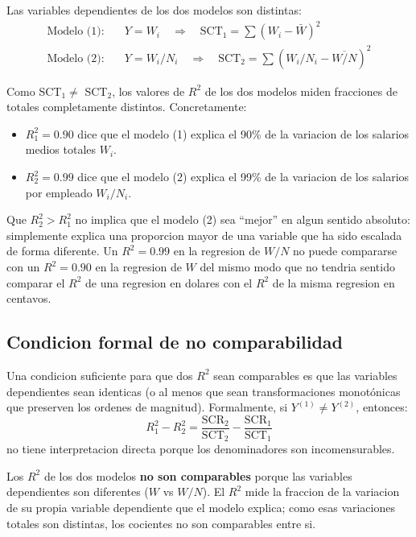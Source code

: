\documentclass[12pt, letterpaper]{article}
\theoremstyle{remark}
\begin{document}
Las variables dependientes de los dos modelos son distintas:
\begin{align}
  \text{Modelo (1):} \quad &Y = W_i \quad \Rightarrow \quad \text{SCT}_1 = \sum(W_i - \bar W)^2\\
  \text{Modelo (2):} \quad &Y = W_i/N_i \quad \Rightarrow \quad \text{SCT}_2 = \sum(W_i/N_i - \overline{W/N})^2
\end{align}

Como SCT$_1 \neq$ SCT$_2$, los valores de $R^2$ de los dos modelos miden
fracciones de totales completamente distintos. Concretamente:

\begin{itemize}[leftmargin=1.6em, itemsep=4pt]
  \item $R^2_1 = 0.90$ dice que el modelo (1) explica el 90\% de la variacion de
    los salarios medios totales $W_i$.
  \item $R^2_2 = 0.99$ dice que el modelo (2) explica el 99\% de la variacion de
    los salarios por empleado $W_i/N_i$.
\end{itemize}

Que $R^2_2 > R^2_1$ no implica que el modelo (2) sea ``mejor'' en algun sentido
absoluto: simplemente explica una proporcion mayor de una variable que ha sido
escalada de forma diferente. Un $R^2 = 0.99$ en la regresion de $W/N$ no puede
compararse con un $R^2 = 0.90$ en la regresion de $W$ del mismo modo que no
tendria sentido comparar el $R^2$ de una regresion en dolares con el $R^2$ de
la misma regresion en centavos.

\subsection{Condicion formal de no comparabilidad}

Una condicion suficiente para que dos $R^2$ sean comparables es que las
variables dependientes sean identicas (o al menos que sean transformaciones
monotónicas que preserven los ordenes de magnitud). Formalmente, si
$Y^{(1)} \neq Y^{(2)}$, entonces:
\begin{equation}
  R^2_1 - R^2_2
    = \frac{\text{SCR}_2}{\text{SCT}_2} - \frac{\text{SCR}_1}{\text{SCT}_1}
  \label{eq:dif_R2}
\end{equation}
no tiene interpretacion directa porque los denominadores son incomensurables.

\begin{clave}
  Los $R^2$ de los dos modelos \textbf{no son comparables} porque las variables
  dependientes son diferentes ($W$ vs $W/N$). El $R^2$ mide la fraccion de la
  variacion de su propia variable dependiente que el modelo explica; como esas
  variaciones totales son distintas, los cocientes no son comparables entre si.
\end{clave}
\end{document}
